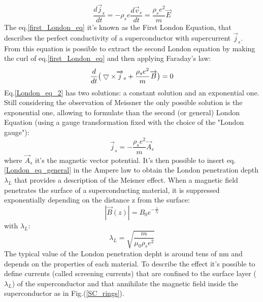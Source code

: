 \documentclass[12pt,a4paper]{report}
\begin{document}
    \begin{equation}
      \frac{d\overrightarrow{j}_s}{dt} = -\rho_s e \frac{d\overrightarrow{v}_s}{dt} = \frac{\rho_s e^2}{m} \overrightarrow{E}
      \label{first_London_eq}
    \end{equation}
    The eq.\ref{first_London_eq} it's known as the First London Equation, that describes the perfect conductivity of a superconductor with supercurrent $\overrightarrow{j}_s$.
    From this equation is possible to extract the second London equation by making the curl of eq.\ref{first_London_eq} and then applying Faraday's law:
    \begin{equation}
    	\frac{d}{dt} \big{(} \bigtriangledown \times \overrightarrow{j}_s + \frac{\rho_s e^2}{m}\overrightarrow{B} \big{)} = 0
    	\label{London_eq_2}
    \end{equation}
    Eq.\ref{London_eq_2} has two solutions: a constant solution and an exponential one. Still considering the observation of Meissner the only possible solution is the exponential one, allowing to formulate than the second (or general) London Equation (using a gauge transformation fixed with the choice of the "London gauge"\cite{Superconductivity}):
    \begin{equation}
    	\overrightarrow{j}_s = -\frac{\rho_s e^2}{m}\overrightarrow{A}_s
    	\label{London_eq_general}
    \end{equation}
    where $\overrightarrow{A}_s$ it's the magnetic vector potential.
    It's then possible to insert eq.\ref{London_eq_general} in the Ampere law to obtain the London penetration depth $\lambda_L$ that provides a description of the Meisner effect. When a magnetic field penetrates the surface of a superconducting material, it is suppressed exponentially depending on the distance z from the surface:
    \begin{equation}
    	|\overrightarrow{B}(z)| = B_0 e^{-\frac{z}{\lambda_l}}
    \end{equation}
    with $\lambda_L$:
    \begin{equation}
    	\lambda_L=\sqrt{\frac{m}{\mu_0 \rho_s e^2}}
    \end{equation}
    The typical value of the London penetration depht is around tens of nm and depends on the properties of each material. To describe the effect it's possible to define currents (called screening currents) that are confined to the surface layer ($\lambda_L$) of the superconductor and that annihilate the magnetic field inside the superconductor as in Fig.(\ref{SC_rings}).\\
\end{document}
